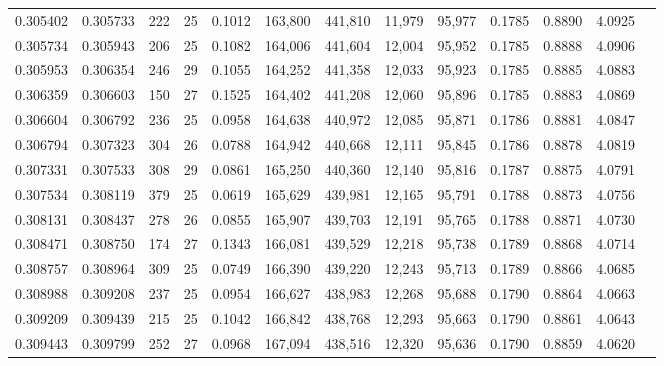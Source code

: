 \begin{tabular}{rrrrrrrrrrrrr}
0.305402 & 0.305733 &   222 &  25 &                                     0.1012 & 163,800 & 441,810 &  11,979 &  95,977 & 0.1785 & 0.8890 & 4.0925 \\
0.305734 & 0.305943 &   206 &  25 &                                     0.1082 & 164,006 & 441,604 &  12,004 &  95,952 & 0.1785 & 0.8888 & 4.0906 \\
0.305953 & 0.306354 &   246 &  29 &                                     0.1055 & 164,252 & 441,358 &  12,033 &  95,923 & 0.1785 & 0.8885 & 4.0883 \\
0.306359 & 0.306603 &   150 &  27 &                                     0.1525 & 164,402 & 441,208 &  12,060 &  95,896 & 0.1785 & 0.8883 & 4.0869 \\
0.306604 & 0.306792 &   236 &  25 &                                     0.0958 & 164,638 & 440,972 &  12,085 &  95,871 & 0.1786 & 0.8881 & 4.0847 \\
0.306794 & 0.307323 &   304 &  26 &                                     0.0788 & 164,942 & 440,668 &  12,111 &  95,845 & 0.1786 & 0.8878 & 4.0819 \\
0.307331 & 0.307533 &   308 &  29 &                                     0.0861 & 165,250 & 440,360 &  12,140 &  95,816 & 0.1787 & 0.8875 & 4.0791 \\
0.307534 & 0.308119 &   379 &  25 &                                     0.0619 & 165,629 & 439,981 &  12,165 &  95,791 & 0.1788 & 0.8873 & 4.0756 \\
0.308131 & 0.308437 &   278 &  26 &                                     0.0855 & 165,907 & 439,703 &  12,191 &  95,765 & 0.1788 & 0.8871 & 4.0730 \\
0.308471 & 0.308750 &   174 &  27 &                                     0.1343 & 166,081 & 439,529 &  12,218 &  95,738 & 0.1789 & 0.8868 & 4.0714 \\
0.308757 & 0.308964 &   309 &  25 &                                     0.0749 & 166,390 & 439,220 &  12,243 &  95,713 & 0.1789 & 0.8866 & 4.0685 \\
0.308988 & 0.309208 &   237 &  25 &                                     0.0954 & 166,627 & 438,983 &  12,268 &  95,688 & 0.1790 & 0.8864 & 4.0663 \\
0.309209 & 0.309439 &   215 &  25 &                                     0.1042 & 166,842 & 438,768 &  12,293 &  95,663 & 0.1790 & 0.8861 & 4.0643 \\
0.309443 & 0.309799 &   252 &  27 &                                     0.0968 & 167,094 & 438,516 &  12,320 &  95,636 & 0.1790 & 0.8859 & 4.0620 \\

\end{tabular}
